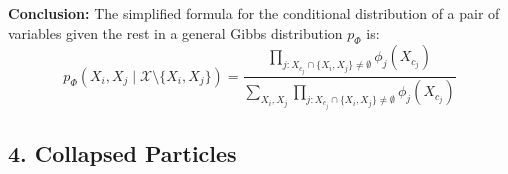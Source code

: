 \documentclass[a4 paper]{article}
\begin{document}
\begin{enumerate}
\begin{enumerate}
\end{enumerate}

\textbf{Conclusion:}
The simplified formula for the conditional distribution of a pair of variables given the rest in a general Gibbs distribution \( p_\Phi \) is:
\[
p_\Phi(X_i, X_j \mid \mathcal{X} \setminus \{X_i, X_j\}) = \frac{\prod_{j: X_{c_j} \cap \{X_i, X_j\} \ne \emptyset} \phi_j(X_{c_j})}{\sum_{X_i, X_j} \prod_{j: X_{c_j} \cap \{X_i, X_j\} \ne \emptyset} \phi_j(X_{c_j})}
\]



\end{enumerate}






\newpage
\subsection*{4. Collapsed Particles}
\end{document}
